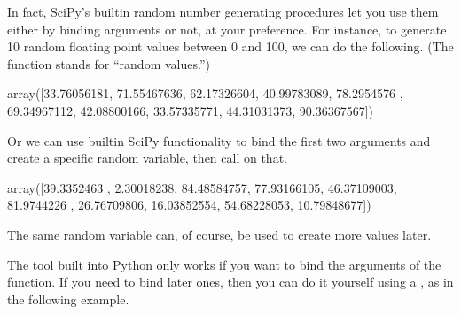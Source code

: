 \documentclass[letterpaper,10pt,english]{jupyterBook}
\begin{document}
\sphinxAtStartPar
In fact, SciPy’s built\sphinxhyphen{}in random number generating procedures let you use them either by binding arguments or not, at your preference.  For instance, to generate 10 random floating point values between 0 and 100, we can do the following.  (The  function stands for “random values.”)

\begin{sphinxVerbatim}[commandchars=\\\{\}]
   
    
\end{sphinxVerbatim}

\begin{sphinxVerbatim}[commandchars=\\\{\}]
array([33.76056181, 71.55467636, 62.17326604, 40.99783089, 78.2954576 ,
       69.34967112, 42.08800166, 33.57335771, 44.31031373, 90.36367567])
\end{sphinxVerbatim}

\sphinxAtStartPar
Or we can use built\sphinxhyphen{}in SciPy functionality to bind the first two arguments and create a specific random variable, then call  on that.

\begin{sphinxVerbatim}[commandchars=\\\{\}]
       
               
\end{sphinxVerbatim}

\begin{sphinxVerbatim}[commandchars=\\\{\}]
array([39.3352463 ,  2.30018238, 84.48584757, 77.93166105, 46.37109003,
       81.9744226 , 26.76709806, 16.03852554, 54.68228053, 10.79848677])
\end{sphinxVerbatim}

\sphinxAtStartPar
The same random variable can, of course, be used to create more values later.

\sphinxAtStartPar
The  tool built into Python only works if you want to bind the  arguments of the function.  If you need to bind later ones, then you can do it yourself using a , as in the following example.
\end{document}

